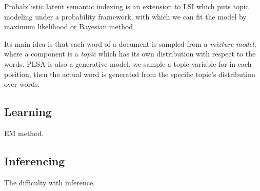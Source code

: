 Probabilistic latent semantic indexing\cite{hofmann1999probabilistic} is an extension to LSI which puts topic modeling under a probability framework, with which we can fit the model by maximum likelihood or Bayesian method.

Its main idea is that each word of a document is sampled from a \emph{mixture model}, where a component is a \emph{topic} which has its own distribution with respect to the words. PLSA is also a generative model, we sample a topic variable for in each position, then the actual word is generated from the specific topic's distribution over words. 

\subsection{Learning}
EM method.

\subsection{Inferencing}
The difficulty with inference. 
